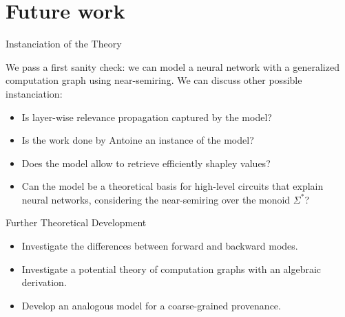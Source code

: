 \documentclass[11pt]{beamer}
\begin{document}
\section{Future work}
\begin{frame}{Instanciation of the Theory}

We pass a first sanity check: we can model a neural network with a generalized computation graph using near-semiring. We can discuss other possible instanciation:

\begin{itemize}

	\item Is layer-wise relevance propagation captured by the model?
	
	\item Is the work done by Antoine an instance of the model?
	
	\item Does the model allow to retrieve efficiently shapley values?
	
	\item Can the model be a theoretical basis for high-level circuits that explain neural networks, considering the near-semiring over the monoid $\Sigma^*$?

\end{itemize}




\end{frame}

\begin{frame}{Further Theoretical Development}

\begin{itemize}
	
	\item Investigate the differences between forward and backward modes.

	\item Investigate a potential theory of computation graphs with an algebraic derivation.

	\item Develop an analogous model for a coarse-grained provenance.

\end{itemize}

\end{frame}
\end{document}
